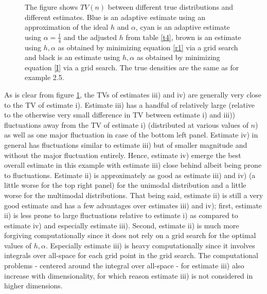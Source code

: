 \documentclass[
twoside,
openright,
titlepage,
numbers=noenddot,
headinclude,%
footinclude=true,
dottedtoc, %
ngerman,
american, %
pagesize=pdftex,
]{book}
\begin{document}
\begin{example}
\begin{figure}[H]
			\caption{The figure shows $TV(n)$ between different true distributions and different estimates. Blue is an adaptive estimate using an approximation of the ideal $h$ and $\alpha$, cyan is an adaptive estimate using $\alpha=\frac{1}{4}$ and the adjusted $h$ from table \ref{t4}, brown is an estimate using $h,\alpha$ as obtained by minimizing equation \eqref{r1} via a grid search and black is an estimate using $h,\alpha$ as obtained by minimizing equation \eqref{I} via a grid search. The true densities are the same as for example 2.5.}
			\label{fig:71}
		\end{figure}
		As is clear from figure \ref{fig:71}, the TVs of estimates iii) and iv) are generally very close to the TV of estimate i). Estimate iii) has a handful of relatively large (relative to the otherwise very small difference in TV between estimate i) and iii)) fluctuations away from the TV of estimate i) (distributed at various values of $n$) as well as one major fluctuation in case of the bottom left panel. Estimate iv) in general has fluctuations similar to estimate iii) but of smaller magnitude and without the major fluctuation entirely. Hence, estimate iv) emerge the best overall estimate in this example with estimate iii) close behind albeit being prone to fluctuations. Estimate ii) is approximately as good as estimate iii) and iv) (a little worse for the top right panel) for the unimodal distribution and a little worse for the multimodal distributions. That being said, estimate ii) is still a very good estimate and has a few advantages over estimates iii) and iv); first, estimate ii) is less prone to large fluctuations relative to estimate i) as compared to estimate iv) and especially estimate iii). Second, estimate ii) is much more forgiving computationally since it does not rely on a grid search for the optimal values of $h,\alpha$. Especially estimate iii) is heavy computationally since it involves integrals over all-space for each grid point in the grid search. The computational problems - centered around the integral over all-space - for estimate iii) also increase with dimensionality, for which reason estimate iii) is not considered in higher dimensions.
	\end{example}
\end{document}
